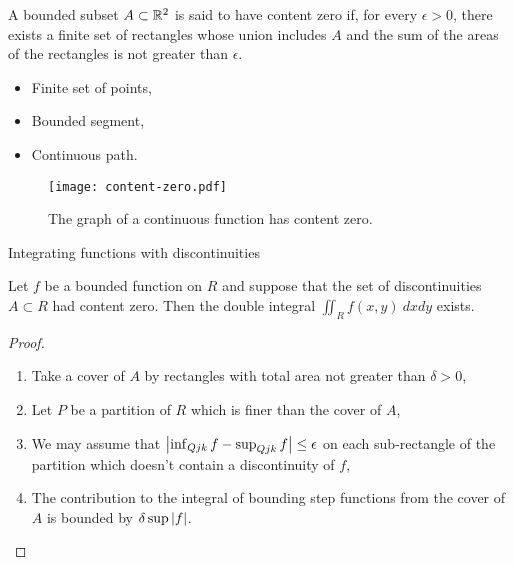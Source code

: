 \begin{definition}
    A bounded subset \(A\subset \mathbb{R}^2\) is said to have content zero if, for every \(\epsilon>0\), there exists a finite set of rectangles whose union includes \(A\) and the sum of the areas of the rectangles is not greater than \(\epsilon\).
\end{definition}







\begin{example}
    \begin{itemize}
        \item Finite set of points,
        \item Bounded segment,
        \item Continuous path.
    \end{itemize}
\end{example}




\begin{figure}
    \centering
    \texttt{[image: content-zero.pdf]}
    \caption{The graph of a continuous function has content zero.}
\end{figure}



{Integrating functions with discontinuities}

\begin{theorem}
    Let \(f\) be a bounded function on \(R\) and suppose that the set of discontinuities \(A\subset R\) had content zero. Then the double integral \(\iint_{R}f(x,y) \ dxdy\) exists.
\end{theorem}
\begin{proof}
    \begin{enumerate}
        \item Take a cover of \(A\) by rectangles with total area not greater than \(\delta>0\),
        \item Let \(P\) be a partition of \(R\) which is finer than the cover of \(A\),
        \item We may assume that \(\left|\inf_{Q{jk}} f - \sup_{Q{jk}} f \right|\leq \epsilon\)  on each sub-rectangle of the partition which doesn't contain a discontinuity of \(f\),
        \item The contribution to the integral of bounding step functions from the cover of \(A\) is bounded by \(\delta \sup \left|f\right|\).
    \end{enumerate}
\end{proof}







